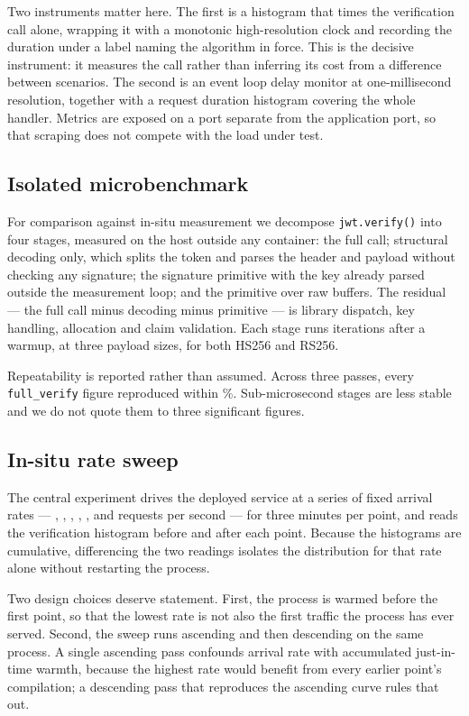 \documentclass[pdflatex,sn-basic,twocolumn]{sn-jnl}
\begin{document}
Two instruments matter here. The first is a histogram that times the
verification call alone, wrapping it with a monotonic high-resolution clock and
recording the duration under a label naming the algorithm in force. This is the
decisive instrument: it measures the call rather than inferring its cost from a
difference between scenarios. The second is an event loop delay monitor at
one-millisecond resolution, together with a request duration histogram covering
the whole handler. Metrics are exposed on a port separate from the application
port, so that scraping does not compete with the load under test.

\subsection{Isolated microbenchmark}

For comparison against in-situ measurement we decompose \texttt{jwt.verify()}
into four stages, measured on the host outside any container: the full call;
structural decoding only, which splits the token and parses the header and
payload without checking any signature; the signature primitive with the key
already parsed outside the measurement loop; and the primitive over raw buffers.
The residual --- the full call minus decoding minus primitive --- is library
dispatch, key handling, allocation and claim validation. Each stage runs
\MbHsHalfKbIterations{} iterations after a warmup, at three payload sizes, for
both HS256 and RS256.

Repeatability is reported rather than assumed. Across three passes, every
\texttt{full\_verify} figure reproduced within \MbFullVerifySpreadPct\%.
Sub-microsecond stages are less stable and we do not quote them to three
significant figures.

\subsection{In-situ rate sweep}

The central experiment drives the deployed service at a series of fixed arrival
rates --- \Five, \Ten, \TwentyFive, \Fifty, \Hundred, \TwoHundred{} and
\FourHundred{} requests per second --- for three minutes per point, and reads
the verification histogram before and after each point. Because the histograms
are cumulative, differencing the two readings isolates the distribution for that
rate alone without restarting the process.

Two design choices deserve statement. First, the process is warmed before the
first point, so that the lowest rate is not also the first traffic the process
has ever served. Second, the sweep runs ascending and then descending on the
same process. A single ascending pass confounds arrival rate with accumulated
just-in-time warmth, because the highest rate would benefit from every earlier
point's compilation; a descending pass that reproduces the ascending curve rules
that out.
\end{document}
